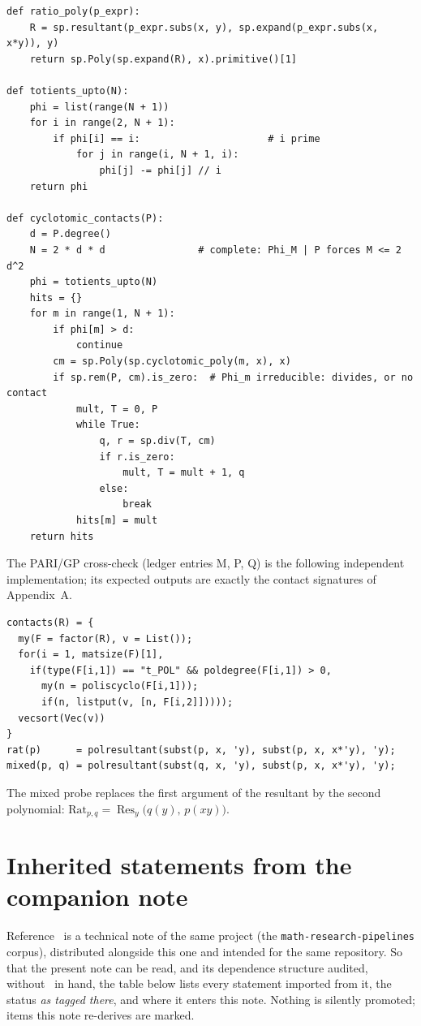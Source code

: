 \documentclass[11pt]{article}
\theoremstyle{plain}
\theoremstyle{definition}
\theoremstyle{remark}
\newcommand{\Rat}{\mathrm{Rat}}
\DeclareMathOperator{\Res}{Res}
\begin{document}
\begin{verbatim}
def ratio_poly(p_expr):
    R = sp.resultant(p_expr.subs(x, y), sp.expand(p_expr.subs(x, x*y)), y)
    return sp.Poly(sp.expand(R), x).primitive()[1]

def totients_upto(N):
    phi = list(range(N + 1))
    for i in range(2, N + 1):
        if phi[i] == i:                      # i prime
            for j in range(i, N + 1, i):
                phi[j] -= phi[j] // i
    return phi

def cyclotomic_contacts(P):
    d = P.degree()
    N = 2 * d * d                # complete: Phi_M | P forces M <= 2 d^2
    phi = totients_upto(N)
    hits = {}
    for m in range(1, N + 1):
        if phi[m] > d:
            continue
        cm = sp.Poly(sp.cyclotomic_poly(m, x), x)
        if sp.rem(P, cm).is_zero:  # Phi_m irreducible: divides, or no contact
            mult, T = 0, P
            while True:
                q, r = sp.div(T, cm)
                if r.is_zero:
                    mult, T = mult + 1, q
                else:
                    break
            hits[m] = mult
    return hits
\end{verbatim}

\noindent The PARI/GP cross-check (ledger entries M, P, Q) is the following
independent implementation; its expected outputs are exactly the contact
signatures of Appendix~A.

\begin{verbatim}
contacts(R) = {
  my(F = factor(R), v = List());
  for(i = 1, matsize(F)[1],
    if(type(F[i,1]) == "t_POL" && poldegree(F[i,1]) > 0,
      my(n = poliscyclo(F[i,1]));
      if(n, listput(v, [n, F[i,2]]))));
  vecsort(Vec(v))
}
rat(p)      = polresultant(subst(p, x, 'y), subst(p, x, x*'y), 'y);
mixed(p, q) = polresultant(subst(q, x, 'y), subst(p, x, x*'y), 'y);
\end{verbatim}

\noindent The mixed probe replaces the first argument of the resultant by the
second polynomial: $\Rat_{p,q}=\Res_y\bigl(q(y),\,p(xy)\bigr)$.

\section{Inherited statements from the companion note}\label{app:inherited}

Reference~\cite{CMC} is a technical note of the same project
(the \texttt{math-research-pipelines} corpus), distributed alongside this
one and intended for the same repository. So that the present note can be
read, and its dependence structure audited, without~\cite{CMC} in hand, the
table below lists every
statement imported from it, the status \emph{as tagged there}, and where it
enters this note. Nothing is silently promoted; items this note re-derives
are marked.
\end{document}
